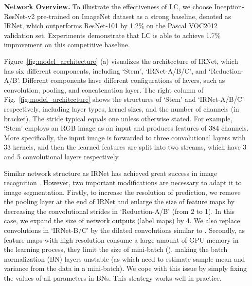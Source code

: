 \documentclass[10pt,twocolumn,letterpaper]{article}
\begin{document}
\noindent
\textbf{Network Overview.} 
To illustrate the effectiveness of LC, we choose Inception-ResNet-v2 pre-trained on ImageNet dataset as a strong baseline, denoted as IRNet, which outperforms ResNet-101 by 1.2\% on the Pascal VOC2012 validation set.
Experiments demonstrate that LC is able to achieve 1.7\% improvement on this competitive baseline.


Figure~\ref{fig:model_architecture} (a) visualizes the architecture of IRNet, which has six different components, including `Stem', `IRNet-A/B/C', and `Reduction-A/B'.
Different components have different configurations of layers, such as convolution, pooling, and concatenation layer.
The right column of Fig.~\ref{fig:model_architecture} shows the structures of `Stem' and `IRNet-A/B/C' respectively, including layer types, kernel sizes, and the number of channels (in bracket).
The stride typical equals one unless otherwise stated.
For example, `Stem' employs an RGB image as an input and produces features of 384 channels.
More specifically, the input image is forwarded to three convolutional layers with 33 kernels, and then the learned features are split into two streams, which have 3 and 5 convolutional layers respectively.


Similar network structure as IRNet has achieved great success in image recognition \cite{szegedy2016inception}.
However, two important modifications are necessary to adapt it to image segmentation.
Firstly, to increase the resolution of prediction, we remove the pooling layer at the end of IRNet and enlarge the size of feature maps by decreasing the convolutional strides in `Reduction-A/B' (from 2 to 1).
In this case, we expand the size of network outputs (label maps) by 4.
We also replace convolutions in `IRNet-B/C' by the dilated convolutions similar to \cite{chen2014semantic}.
Secondly, as feature maps with high resolution consume a large amount of GPU memory in the learning process, they limit the size of mini-batch (), making the batch normalization (BN) layers \cite{ioffe2015batch} unstable (as which need to estimate sample mean and variance from the data in a mini-batch).
We cope with this issue by simply fixing the values of all parameters in BNs.
This strategy works well in practice.
\end{document}
